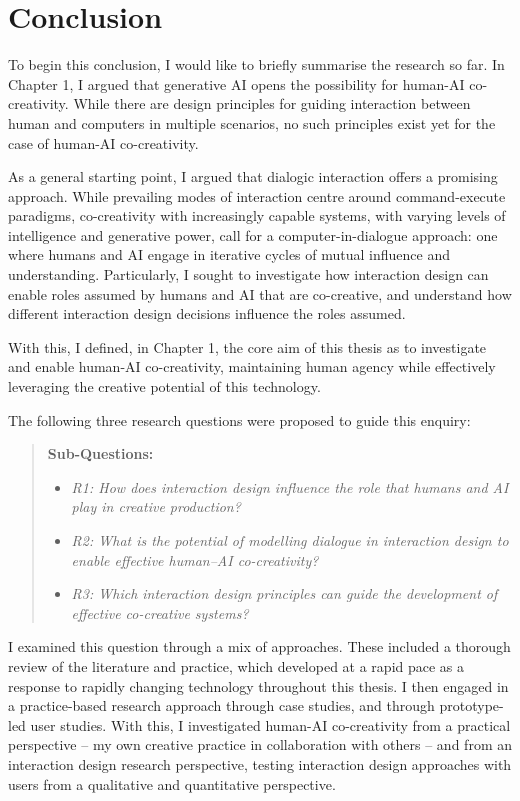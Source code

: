 \chapter[Conclusion]{Conclusion}\label{c:conclusion}

To begin this conclusion, I would like to briefly summarise the research so far. In Chapter 1, I argued that generative AI opens the possibility for human-AI co-creativity. While there are design principles for guiding interaction between human and computers in multiple scenarios, no such principles exist yet for the case of human-AI co-creativity.

As a general starting point, I argued that dialogic interaction offers a promising approach. While prevailing modes of interaction centre around command-execute paradigms, co-creativity with increasingly capable systems, with varying levels of intelligence and generative power, call for a computer-in-dialogue approach: one where humans and AI engage in iterative cycles of mutual influence and understanding. Particularly, I sought to investigate how interaction design can enable roles assumed by humans and AI that are co-creative, and understand how different interaction design decisions influence the roles assumed.

With this, I defined, in Chapter 1, the core aim of this thesis as to investigate and enable human-AI co-creativity, maintaining human agency while effectively leveraging the creative potential of this technology.

The following three research questions were proposed to guide this enquiry:

\begin{quote}
\textbf{Sub-Questions:}
\begin{itemize}
    \item \emph{R1: How does interaction design influence the role that humans and AI play in creative production?}
    \item \emph{R2: What is the potential of modelling dialogue in interaction design to enable effective human–AI co-creativity?}
    \item \emph{R3: Which interaction design principles can guide the development of effective co-creative systems?}
\end{itemize}
\end{quote}

I examined this question through a mix of approaches. These included a thorough review of the literature and practice, which developed at a rapid pace as a response to rapidly changing technology throughout this thesis. I then engaged in a practice-based research approach through case studies, and through prototype-led user studies. With this, I investigated human-AI co-creativity from a practical perspective -- my own creative practice in collaboration with others -- and from an interaction design research perspective, testing interaction design approaches with users from a qualitative and quantitative perspective.


